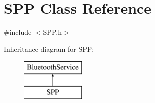 \hypertarget{class_s_p_p}{\section{\-S\-P\-P \-Class \-Reference}
\label{class_s_p_p}
}


{\ttfamily \#include $<$\-S\-P\-P.\-h$>$}

\-Inheritance diagram for \-S\-P\-P\-:\begin{figure}[H]
\begin{center}
\leavevmode
\includegraphics[height=2.000000cm]{class_s_p_p}
\end{center}
\end{figure}
